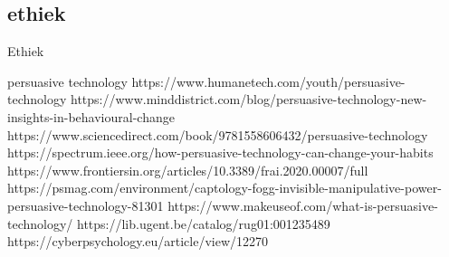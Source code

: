 



\subsection{ethiek}


Ethiek 



persuasive technology 
https://www.humanetech.com/youth/persuasive-technology 
https://www.minddistrict.com/blog/persuasive-technology-new-insights-in-behavioural-change 
https://www.sciencedirect.com/book/9781558606432/persuasive-technology 
https://spectrum.ieee.org/how-persuasive-technology-can-change-your-habits 
https://www.frontiersin.org/articles/10.3389/frai.2020.00007/full 
https://psmag.com/environment/captology-fogg-invisible-manipulative-power-persuasive-technology-81301 
https://www.makeuseof.com/what-is-persuasive-technology/ 
https://lib.ugent.be/catalog/rug01:001235489 
https://cyberpsychology.eu/article/view/12270 
